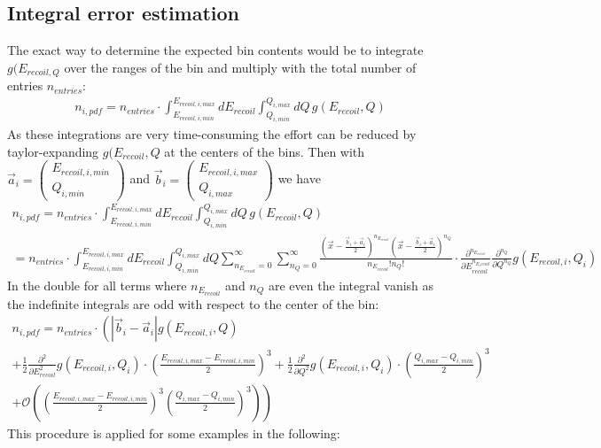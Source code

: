 \documentclass[10pt, a4paper]{article}
\begin{document}
\subsection{Integral error estimation}
The exact way to determine the expected bin contents would be to integrate $g(E_{recoil,Q}$ over the ranges of the bin and multiply with the total number of entries $n_{entries}$:
\begin{gather}
n_{i,pdf} = n_{entries} \cdot \int_{E_{recoil,i,min}}^{E_{recoil,i,max}} dE_{recoil} \int_{Q_{i,min}}^{Q_{i,max}} dQ \, g(E_{recoil},Q)
\end{gather}
As these integrations are very time-consuming the effort can be reduced by taylor-expanding $g(E_{recoil},Q$ at the centers of the bins.
Then with $\vec{a}_i = \begin{pmatrix} E_{recoil,i,min} \\ Q_{i,min} \end{pmatrix}$ and $\vec{b}_i = \begin{pmatrix} E_{recoil,i,max} \\ Q_{i,max} \end{pmatrix}$ we have
\begin{gather}
n_{i,pdf} = n_{entries} \cdot \int_{E_{recoil,i,min}}^{E_{recoil,i,max}} dE_{recoil} \int_{Q_{i,min}}^{Q_{i,max}} dQ \, g(E_{recoil},Q) \\
 = n_{entries} \cdot \int_{E_{recoil,i,min}}^{E_{recoil,i,max}} dE_{recoil} \int_{Q_{i,min}}^{Q_{i,max}} dQ \sum_{n_{E_{recoil}} = 0}^\infty \sum_{n_{Q} = 0}^\infty
\frac{\left( \vec{x} - \frac{\vec{b}_i + \vec{a}_i}{2} \right)^{n_{E_{recoil}}} \left( \vec{x} - \frac{\vec{b}_i + \vec{a}_i}{2} \right)^{n_{Q}}}{n_{E_{recoil}}! n_Q!}
\cdot \frac{\partial^{n_{E_{recoil}}}}{\partial E_{recoil} ^{n_{E_recoil}}} \frac{\partial^{n_{Q}}}{\partial Q^{n_{Q}}} g(E_{recoil,i},Q_i)
\end{gather}
In the double for all terms where $n_{E_{recoil}}$ and $n_{Q}$ are even the integral vanish as the indefinite integrals are odd with respect to the center of the bin:
\begin{gather}
n_{i,pdf} = n_{entries} \cdot \left(  \left| \vec{b}_i - \vec{a}_i \right| g(E_{recoil,i},Q) \right. \\
+ \frac{1}{2} \frac{\partial^2}{\partial E_{recoil}^2} g(E_{recoil,i},Q_i) \cdot \left( \frac{E_{recoil,i,max} - E_{recoil,i,min}}{2} \right)^3 
+ \frac{1}{2} \frac{\partial^2}{\partial Q^2} g(E_{recoil,i},Q_i) \cdot \left( \frac{Q_{i,max} - Q_{i,min}}{2} \right)^3  \\
+ \left. \mathcal O \left( \left( \frac{E_{recoil,i,max} - E_{recoil,i,min}}{2} \right)^3 \left( \frac{Q_{i,max} - Q_{i,min}}{2} \right)^3 \right) \right)
\end{gather}
This procedure is applied for some examples in the following: \\[0.5cm]
\end{document}
